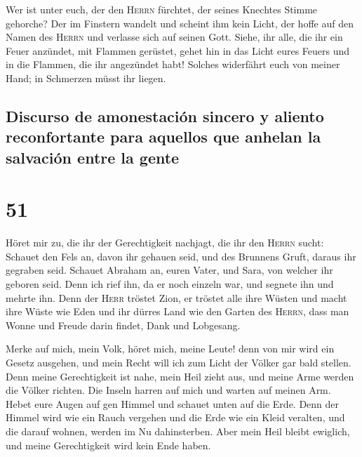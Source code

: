  Wer ist unter euch, der den \textsc{Herrn} fürchtet, der
seines Knechtes Stimme gehorche? Der im Finstern wandelt und scheint ihm
kein Licht, der hoffe auf den Namen des \textsc{Herrn} und verlasse sich
auf seinen Gott.  Siehe, ihr alle, die ihr ein Feuer
anzündet, mit Flammen gerüstet, gehet hin in das Licht eures Feuers und
in die Flammen, die ihr angezündet habt! Solches widerfährt euch von
meiner Hand; in Schmerzen müsst ihr liegen.

\hypertarget{discurso-de-amonestaciuxf3n-sincero-y-aliento-reconfortante-para-aquellos-que-anhelan-la-salvaciuxf3n-entre-la-gente}{%
\subsection{Discurso de amonestación sincero y aliento reconfortante
para aquellos que anhelan la salvación entre la
gente}\label{discurso-de-amonestaciuxf3n-sincero-y-aliento-reconfortante-para-aquellos-que-anhelan-la-salvaciuxf3n-entre-la-gente}}

\hypertarget{section-50}{%
\section{51}\label{section-50}}

 Höret mir zu, die ihr der Gerechtigkeit nachjagt, die ihr
den \textsc{Herrn} sucht: Schauet den Fels an, davon ihr gehauen seid,
und des Brunnens Gruft, daraus ihr gegraben seid.  Schauet
Abraham an, euren Vater, und Sara, von welcher ihr geboren seid. Denn
ich rief ihn, da er noch einzeln war, und segnete ihn und mehrte ihn.
 Denn der \textsc{Herr} tröstet Zion, er tröstet alle ihre
Wüsten und macht ihre Wüste wie Eden und ihr dürres Land wie den Garten
des \textsc{Herrn}, dass man Wonne und Freude darin findet, Dank und
Lobgesang.

 Merke auf mich, mein Volk, höret mich, meine Leute! denn
von mir wird ein Gesetz ausgehen, und mein Recht will ich zum Licht der
Völker gar bald stellen.  Denn meine Gerechtigkeit ist
nahe, mein Heil zieht aus, und meine Arme werden die Völker richten. Die
Inseln harren auf mich und warten auf meinen Arm.  Hebet
eure Augen auf gen Himmel und schauet unten auf die Erde. Denn der
Himmel wird wie ein Rauch vergehen und die Erde wie ein Kleid veralten,
und die darauf wohnen, werden im Nu dahinsterben. Aber mein Heil bleibt
ewiglich, und meine Gerechtigkeit wird kein Ende haben.

